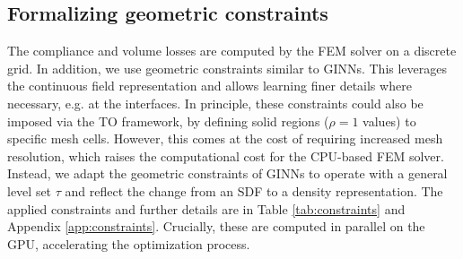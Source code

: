 \subsection{Formalizing geometric constraints}
\label{sec:geom_constraints}

The compliance and volume losses are computed by the FEM solver on a discrete grid.
In addition, we use geometric constraints similar to GINNs.
This leverages the continuous field representation and allows learning finer details where necessary, e.g. at the interfaces.
In principle, these constraints could also be imposed via the TO framework, by defining solid regions ($\rho=1$ values) to specific mesh cells.
However, this comes at the cost of requiring increased mesh resolution, which raises the computational cost for the CPU-based FEM solver.
Instead, we adapt the geometric constraints of GINNs to operate with a general level set $\tau$ and reflect the change from an SDF to a density representation.
The applied constraints and further details are in Table \ref{tab:constraints} and Appendix \ref{app:constraints}. Crucially, these are computed in parallel on the GPU, accelerating the optimization process.
